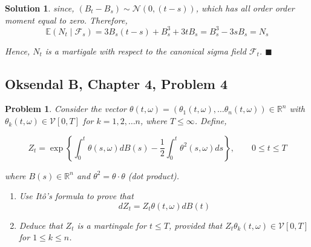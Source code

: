 \documentclass[12pt]{article}
\theoremstyle{problemstyle}
\newtheorem{pbm}{Problem}
\newtheorem*{solution*}{Solution}
\newenvironment{problem}{
\begin{tcolorbox}[colback=green!10!white,colframe=black!75!black, parbox = false]\begin{pbm} }{\end{pbm}\end{tcolorbox} }
\newcommand{\E}{\mathbb{E}}
\newcommand{\normal}{\mathcal{N}}
\newcommand{\R}{\mathbb{R}}
\begin{document}
\begin{solution*}
\noindent since, $(B_t - B_s) \sim \normal(0, (t-s))$, which has all order order moment equal to zero. Therefore,
$$
\E(N_t \mid \mathcal{F}_s) = 3B_s(t-s) + B_s^3 + 3 t B_s = B_s^3 - 3s B_s = N_s
$$

Hence, $N_t$ is a martigale with respect to the canonical sigma field $\mathcal{F}_t$. \hfill $\blacksquare$

\end{solution*}

\newpage 

\subsection{Oksendal B, Chapter 4, Problem 4}
\begin{problem}
Consider the vector $\theta(t, \omega) = (\theta_1(t, \omega), \dots \theta_n(t, \omega)) \in \R^n$ with $\theta_k(t, \omega) \in \mathcal{V}[0, T]$ for $k = 1, 2, \dots n$, where $T \leq \infty$. Define,

$$
Z_t = \exp\left\{ \int_0^t \theta(s, \omega) dB(s) - \dfrac{1}{2} \int_0^t \theta^2(s, \omega) ds \right\}, \qquad 0 \leq t \leq T
$$

\noindent where $B(s) \in \R^n$ and $\theta^2 = \theta \cdot \theta$ (dot product). 
\begin{enumerate}
    \item[(a)] Use It\^o's formula to prove that 
    $$
    dZ_t = Z_t \theta(t, \omega) dB(t)
    $$
    \item[(b)] Deduce that $Z_t$ is a martingale for $t \leq T$, provided that $Z_t \theta_k(t, \omega) \in \mathcal{V}[0, T]$ for $1 \leq k \leq n$.
\end{enumerate}

\end{problem}
\end{document}
